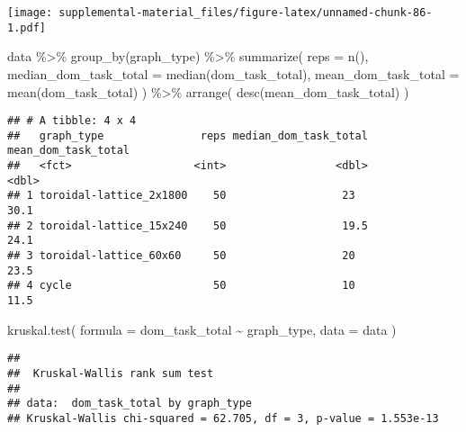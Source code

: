 \documentclass[
]{book}
\newenvironment{Shaded}{\begin{snugshade}}{\end{snugshade}}
\newcommand{\AttributeTok}[1]{\textcolor[rgb]{0.77,0.63,0.00}{#1}}
\newcommand{\FunctionTok}[1]{\textcolor[rgb]{0.00,0.00,0.00}{#1}}
\newcommand{\NormalTok}[1]{#1}
\newcommand{\SpecialCharTok}[1]{\textcolor[rgb]{0.00,0.00,0.00}{#1}}
\begin{document}
\texttt{[image: supplemental-material\_files/figure-latex/unnamed-chunk-86-1.pdf]}

\begin{Shaded}
\begin{Highlighting}[]
\NormalTok{data }\SpecialCharTok{\%\textgreater{}\%}
  \FunctionTok{group\_by}\NormalTok{(graph\_type) }\SpecialCharTok{\%\textgreater{}\%}
  \FunctionTok{summarize}\NormalTok{(}
    \AttributeTok{reps =} \FunctionTok{n}\NormalTok{(),}
    \AttributeTok{median\_dom\_task\_total =} \FunctionTok{median}\NormalTok{(dom\_task\_total),}
    \AttributeTok{mean\_dom\_task\_total =} \FunctionTok{mean}\NormalTok{(dom\_task\_total)}
\NormalTok{  ) }\SpecialCharTok{\%\textgreater{}\%}
  \FunctionTok{arrange}\NormalTok{(}
    \FunctionTok{desc}\NormalTok{(mean\_dom\_task\_total)}
\NormalTok{  )}
\end{Highlighting}
\end{Shaded}

\begin{verbatim}
## # A tibble: 4 x 4
##   graph_type               reps median_dom_task_total mean_dom_task_total
##   <fct>                   <int>                 <dbl>               <dbl>
## 1 toroidal-lattice_2x1800    50                  23                  30.1
## 2 toroidal-lattice_15x240    50                  19.5                24.1
## 3 toroidal-lattice_60x60     50                  20                  23.5
## 4 cycle                      50                  10                  11.5
\end{verbatim}

\begin{Shaded}
\begin{Highlighting}[]
\FunctionTok{kruskal.test}\NormalTok{(}
  \AttributeTok{formula =}\NormalTok{ dom\_task\_total }\SpecialCharTok{\textasciitilde{}}\NormalTok{ graph\_type,}
  \AttributeTok{data =}\NormalTok{ data}
\NormalTok{)}
\end{Highlighting}
\end{Shaded}

\begin{verbatim}
## 
##  Kruskal-Wallis rank sum test
## 
## data:  dom_task_total by graph_type
## Kruskal-Wallis chi-squared = 62.705, df = 3, p-value = 1.553e-13
\end{verbatim}
\end{document}

